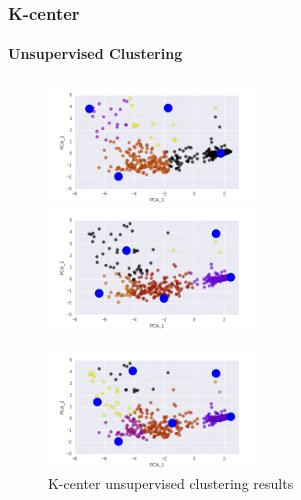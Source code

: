 \documentclass[pdf]{beamer}
\begin{document}
  \begin{frame}
    \frametitle{K-center}
    \framesubtitle{Unsupervised Clustering}

    \begin{figure}
    \centering
    \includegraphics[width=0.5\textwidth]{m3.png}
    \includegraphics[width=0.5\textwidth]{m4.png}
    \end{figure}

    \begin{figure}
    \centering
    \includegraphics[width=0.5\textwidth]{m5.png}
    \caption{K-center unsupervised clustering results}
    \end{figure}

    \end{frame}
\end{document}
